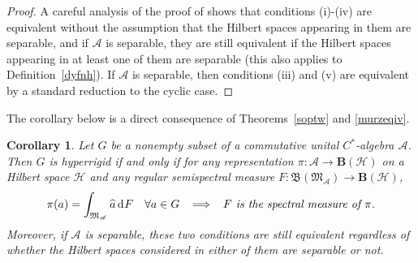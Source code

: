 \documentclass[reqno]{amsproc}
\numberwithin{equation}{section}
\newtheorem{corollary}[theorem]{Corollary}
\theoremstyle{remark}
\newcommand*{\ascr}{\mathscr{A}}
\newcommand*{\hh}{\mathcal{H}}
\newcommand*{\borel}{\mathfrak{B}}
\newcommand*{\D}{\mathrm{d\hspace{.1ex}}}
\theoremstyle{definition}
\newcommand*{\ogr}{\boldsymbol{B}}
\begin{document}
   \begin{proof}
A careful analysis of the proof of
\cite[Theorem~2.1]{Arv11} shows that conditions
(i)-(iv) are equivalent without the assumption that
the Hilbert spaces appearing in them are separable,
and if $\ascr$ is separable, they are still equivalent
if the Hilbert spaces appearing in at least one of
them are separable (this also applies to
Definition~\ref{dyfnh}). If $\ascr$ is separable, then
conditions (iii) and (v) are equivalent by a standard
reduction to the cyclic case.
   \end{proof}
The corollary below is a direct consequence of
Theorems~\ref{soptw} and \ref{murzeqiv}.
   \begin{corollary}\label{toeq-1}
Let $G$ be a nonempty subset of a commutative unital
$C^*$-algebra $\ascr$. Then $G$ is hyperrigid if and
only if for any representation $\pi\colon \ascr\to
\ogr(\hh)$ on a Hilbert space $\hh$ and any regular
semispectral measure $F\colon
\borel(\mathfrak{M}_{\ascr}) \to \ogr(\hh)$,
   \begin{align*}
\pi(a) = \int_{\mathfrak{M}_{\ascr}} \widehat{a} \, \D
F \quad \forall a \in G \;\;\implies\;\; \textit{$F$
is the spectral measure of $\pi$.}
   \end{align*}
Moreover, if $\ascr$ is separable, these two
conditions are still equivalent regardless of whether
the Hilbert spaces considered in either of them are
separable or not.
   \end{corollary}
\end{document}
